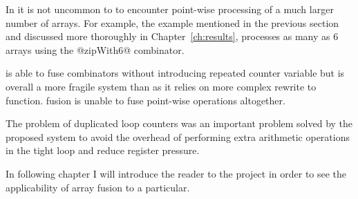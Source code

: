 \documentclass[preamble.tex]{subfiles}
\begin{document}
In \DPH\idph it is not uncommon to to encounter point-wise processing of a much larger number of arrays. For example, the \QuickHull example mentioned in the previous section and discussed more thoroughly in Chapter~\ref{ch:results}, processes as many as 6 arrays using the @zipWith6@ combinator.

\ifaf is able to fuse  combinators without introducing repeated counter variable but is overall a more fragile system than \StreamFusion as it relies on more complex rewrite to function. \ishortcut fusion is unable to fuse point-wise operations altogether.

The problem of duplicated loop counters was an important problem solved by the proposed \LiveFusion system to avoid the overhead of performing extra arithmetic operations in the tight loop and reduce register pressure.


In following chapter I will introduce the reader to the \DPH project in order to see the applicability of array fusion to a particular.


\IfNotCompilingAll{}
\end{document}
